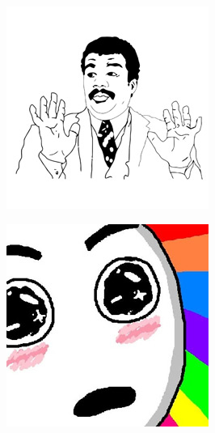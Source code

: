 \begin{multicols}{8}
\begin{center}
\includegraphics[width=\linewidth]{./IMG-GIT/MEMES/Meme-Faces-11.jpg}
\end{center}

\begin{center}  
\includegraphics[width=\linewidth]{./IMG-GIT/MEMES/Meme-Faces-20.jpg} 
\end{center}


\end{multicols}

